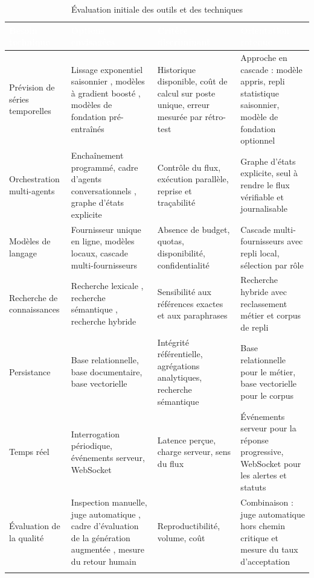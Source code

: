 \begin{longtable}{|P{2.6cm}|P{3.4cm}|P{4.0cm}|P{3.8cm}|}
\hline
{}
\textcolor{white}{\textbf{Besoin technique}} &
\textcolor{white}{\textbf{Options envisagées}} &
\textcolor{white}{\textbf{Critère discriminant}} &
\textcolor{white}{\textbf{Orientation retenue}} \\
\hline
\endhead
\hline
\endfoot
\hline
\endlastfoot
Prévision de séries temporelles & Lissage exponentiel saisonnier \cite{holt2004forecasting,winters1960forecasting}, modèles à gradient boosté \cite{chen2016xgboost}, modèles de fondation pré-entraînés \cite{das2024timesfm} & Historique disponible, coût de calcul sur poste unique, erreur mesurée par rétro-test & Approche en cascade : modèle appris, repli statistique saisonnier, modèle de fondation optionnel \\
\hline
Orchestration multi-agents & Enchaînement programmé, cadre d'agents conversationnels \cite{wu2023autogen}, graphe d'états explicite & Contrôle du flux, exécution parallèle, reprise et traçabilité & Graphe d'états explicite, seul à rendre le flux vérifiable et journalisable \\
\hline
Modèles de langage & Fournisseur unique en ligne, modèles locaux, cascade multi-fournisseurs & Absence de budget, quotas, disponibilité, confidentialité & Cascade multi-fournisseurs avec repli local, sélection par rôle \\
\hline
Recherche de connaissances & Recherche lexicale \cite{robertson2009bm25}, recherche sémantique \cite{lewis2020rag}, recherche hybride \cite{gao2024rag} & Sensibilité aux références exactes et aux paraphrases & Recherche hybride avec reclassement métier et corpus de repli \\
\hline
Persistance & Base relationnelle, base documentaire, base vectorielle \cite{wang2021milvus} & Intégrité référentielle, agrégations analytiques, recherche sémantique & Base relationnelle pour le métier, base vectorielle pour le corpus \\
\hline
Temps réel & Interrogation périodique, événements serveur, WebSocket & Latence perçue, charge serveur, sens du flux & Événements serveur pour la réponse progressive, WebSocket pour les alertes et statuts \\
\hline
Évaluation de la qualité & Inspection manuelle, juge automatique \cite{zheng2023judge}, cadre d'évaluation de la génération augmentée \cite{es2024ragas}, mesure du retour humain & Reproductibilité, volume, coût & Combinaison : juge automatique hors chemin critique et mesure du taux d'acceptation \\
\hline
\caption{Évaluation initiale des outils et des techniques}
\label{tab:outils-techniques-chap2}
\end{longtable}
\endgroup

